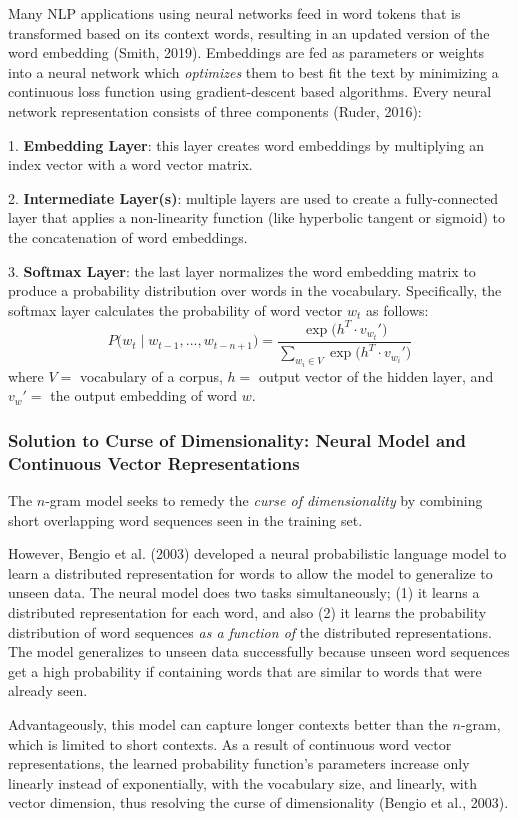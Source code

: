 Many NLP applications using neural networks feed in word tokens that is transformed based on its context words, resulting in an updated version of the word embedding (Smith, 2019). Embeddings are fed as parameters or weights into a neural network which \emph{optimizes} them to best fit the text by minimizing a continuous loss function using gradient-descent based algorithms. Every neural network representation consists of three components (Ruder, 2016):

1. \textbf{Embedding Layer}: this layer creates word embeddings by multiplying an index vector with a word vector matrix. 

2. \textbf{Intermediate Layer(s)}: multiple layers are used to create a fully-connected layer that applies a non-linearity function (like hyperbolic tangent or sigmoid) to the concatenation of word embeddings. 

3. \textbf{Softmax Layer}: the last layer normalizes the word embedding matrix to produce a probability distribution over words in the vocabulary. Specifically, the softmax layer calculates the probability of word vector $w_t$ as follows: 
$$
P \Big(w_t \; | \; w_{t-1}, ..., w_{t-n+1} \Big) = \frac {\exp{ \Big(h^T \cdot v_{w_t}' \Big) }} {\sum_{w_i \in V} \exp{ \Big(h^T \cdot v_{w_i}' \Big) }}
$$
where $V = $ vocabulary of a corpus, $h = $ output vector of the hidden layer, and $v_w' = $ the output embedding of word $w$. 

\subsubsection{Solution to Curse of Dimensionality: Neural Model and Continuous Vector Representations}

The $n$-gram model seeks to remedy the \emph{curse of dimensionality} by combining short overlapping word sequences seen in the training set. 

However, Bengio et al. (2003) developed a neural probabilistic language model to learn a distributed representation for words to allow the model to generalize to unseen data. The neural model does two tasks simultaneously; (1) it learns a distributed representation for each word, and also (2) it learns the probability distribution of word sequences \emph{as a function of} the distributed representations. The model generalizes to unseen data successfully because unseen word sequences get a high probability if containing words that are similar to words that were already seen.  

Advantageously, this model can capture longer contexts better than the $n$-gram, which is limited to short contexts. As a result of continuous word vector representations, the learned probability function's parameters increase only linearly instead of exponentially, with the vocabulary size, and linearly, with vector dimension, thus resolving the curse of dimensionality (Bengio et al., 2003). 

